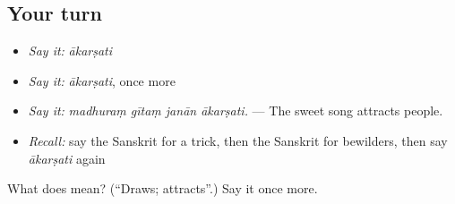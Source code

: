 \subsection*{Your turn}
\begin{itemize}
\raggedright
  \item \emph{Say it:} \emph{ākarṣati}
  \item \emph{Say it:} \emph{ākarṣati}, once more
  \item \emph{Say it:} \emph{madhuraṃ gītaṃ janān ākarṣati.} — The sweet song attracts people.
  \item \emph{Recall:} say the Sanskrit for a trick, then the Sanskrit for bewilders, then say \emph{ākarṣati} again
\end{itemize}

\begin{tcolorbox}[breakable,colback=teal!4,colframe=teal!35!black,title={Before you move on}]
What does  mean? (\textquotedblleft{}Draws; attracts\textquotedblright{}.) Say it once more.
\end{tcolorbox}
